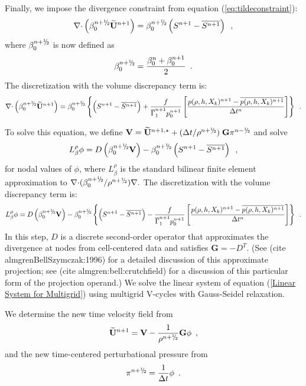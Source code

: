 \begin{description}
Finally, we impose the divergence constraint from equation (\ref{eq:tildeconstraint}):
\begin{equation}
\nablab \cdotb \left(\beta_0^{\nph} \Ubt^{n+1} \right) 
= \beta_0^{\nph} \left(S^{n+1} - \overline{S^{n+1}} \right) \enskip,
\end{equation}
where $\beta_0^{n+\myhalf}$ is now defined as
\begin{equation}
\beta_0^{n+\myhalf} = \frac{\beta_0^n + \beta_0^{n+1}}{2}\enskip .
\end{equation}
The discretization with the volume discrepancy term is:
\begin{equation}
\nablab \cdotb \left(\beta_0^{\nph} \Ubt^{n+1} \right)  = \beta_0^{\nph}\left\{  \left(S^{n+1} - \overline{S^{n+1}} \right)
+ \frac{f}{\gammabar^{n+1} p_0^{n+1}}
\left[\frac{p(\rho,h,X_k)^{n+1} - \overline{p(\rho,h,X_k)^{n+1}}}{\Delta t^n}\right]\right\}
\enskip .
\end{equation}

To solve this equation, we define
${\bf V} = \Ubt^{n+1,\star} + ( \dt / \rho^\nph ) \; \mathbf{G} \pi^\nmh$ 
and solve
\begin{equation}
 L_\beta^\rho \phi = D \left ( \beta_0^{\nph} {\bf V} \right) - \beta_0^{\nph} 
\left(S^{n+1}-\overline{S^{n+1}} \right) \enskip, \label{Linear System for Multigrid}
\end{equation}
for nodal values of $\phi$, where $L_\beta^\rho$ is the standard bilinear
finite element approximation to $\nablab \cdotb ({\beta_0^\nph}/{\rho^\nph}) \nablab.$
The discretization with the volume discrepancy term is:
\begin{equation}
 L_\beta^\rho \phi =
   D \left ( \beta_0^{\nph} {\bf V} \right) - \beta_0^{\nph}\left\{ \left(S^{n+1}-\overline{S^{n+1}} \right)
- \frac{f}{\gammabar^{n+1} p_0^{n+1}}
\left[\frac{p(\rho,h,X_k)^{n+1} - \overline{p(\rho,h,X_k)^{n+1}}}{\Delta t^n}\right]\right\} \enskip.
\end{equation}
In this step, $D$ is a discrete second-order operator that approximates the 
divergence at nodes from cell-centered data and satisfies
$\mathbf{G} = -D^T.$ 
(See (cite almgrenBellSzymczak:1996) for a detailed discussion of this
approximate projection; see (cite almgren:bell:crutchfield) for a discussion
of this particular form of the projection operand.)  
We solve the linear system of equation (\ref{Linear System for Multigrid})
using multigrid V-cycles with Gauss-Seidel relaxation.

We determine the new time velocity field from
\begin{equation}
\Ubt^{n+1} = {\bf V} - \frac{1}{\rho^\nph} \mathbf{G} \phi \enskip ,
\end{equation}
and the new time-centered perturbational pressure from
\begin{equation}
  \pi^\nph = \frac{1}{\dt} \phi \enskip .
\end{equation}


\end{description}
